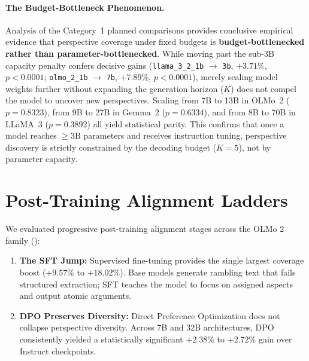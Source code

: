 \documentclass[11pt,a4paper]{article}
\begin{document}
\paragraph{The Budget-Bottleneck Phenomenon.} Analysis of the Category~1 planned comparisons provides conclusive empirical evidence that perspective coverage under fixed budgets is \textbf{budget-bottlenecked rather than parameter-bottlenecked}. While moving past the sub-3B capacity penalty confers decisive gains (\texttt{llama\_3\_2\_1b} $\to$ \texttt{3b}, $+3.71\%$, $p < 0.0001$; \texttt{olmo\_2\_1b} $\to$ \texttt{7b}, $+7.89\%$, $p < 0.0001$), merely scaling model weights further without expanding the generation horizon ($K$) does not compel the model to uncover new perspectives. Scaling from 7B to 13B in OLMo~2 ($p = 0.8323$), from 9B to 27B in Gemma~2 ($p = 0.6334$), and from 8B to 70B in LLaMA~3 ($p = 0.3892$) all yield statistical parity. This confirms that once a model reaches $\ge 3\text{B}$ parameters and receives instruction tuning, perspective discovery is strictly constrained by the decoding budget ($K = 5$), not by parameter capacity.

\section{Post-Training Alignment Ladders}
\label{sec:alignment_ladders}

We evaluated progressive post-training alignment stages across the OLMo 2 family ():
\begin{enumerate}[leftmargin=*,itemsep=1pt]
    \item \textbf{The SFT Jump:} Supervised fine-tuning provides the single largest coverage boost ($+9.57\%$ to $+18.02\%$). Base models generate rambling text that fails structured extraction; SFT teaches the model to focus on assigned aspects and output atomic arguments.
    \item \textbf{DPO Preserves Diversity:} Direct Preference Optimization does not collapse perspective diversity. Across 7B and 32B architectures, DPO consistently yielded a statistically significant $+2.38\%$ to $+2.72\%$ gain over Instruct checkpoints.
\end{enumerate}
\end{document}
